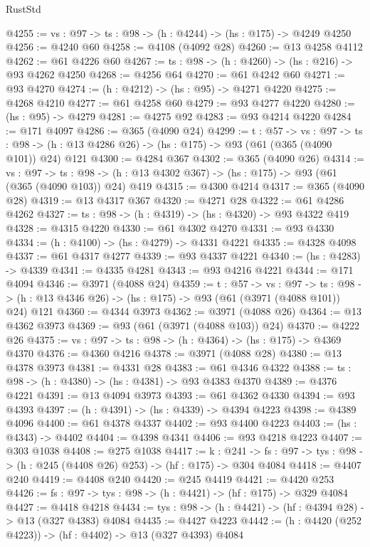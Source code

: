\begin{lexlean}{RustStd}
\begin{coremodule}
@4255 := {vs : @97} -> {ts : @98} -> (h : @4244) -> (hs : @175) -> @4249 @4250
@4256 := @4240 @60
@4258 := @4108 (@4092 @28)
@4260 := @13 @4258 @4112
@4262 := @61 @4226 @60
@4267 := {ts : @98} -> (h : @4260) -> (hs : @216) -> @93 @4262 @4250
@4268 := @4256 @64
@4270 := @61 @4242 @60
@4271 := @93 @4270
@4274 := (h : @4212) -> (hs : @95) -> @4271 @4220
@4275 := @4268 @4210
@4277 := @61 @4258 @60
@4279 := @93 @4277 @4220
@4280 := (hs : @95) -> @4279
@4281 := @4275 @92
@4283 := @93 @4214 @4220
@4284 := @171 @4097
@4286 := @365 (@4090 @24)
@4299 := {t : @57} ->
  {vs : @97} ->
  {ts : @98} -> (h : @13 @4286 @26) -> (hs : @175) -> @93 (@61 (@365 (@4090 @101)) @24) @121
@4300 := @4284 @367
@4302 := @365 (@4090 @26)
@4314 := {vs : @97} ->
  {ts : @98} -> (h : @13 @4302 @367) -> (hs : @175) -> @93 (@61 (@365 (@4090 @103)) @24) @419
@4315 := @4300 @4214
@4317 := @365 (@4090 @28)
@4319 := @13 @4317 @367
@4320 := @4271 @28
@4322 := @61 @4286 @4262
@4327 := {ts : @98} -> (h : @4319) -> (hs : @4320) -> @93 @4322 @419
@4328 := @4315 @4220
@4330 := @61 @4302 @4270
@4331 := @93 @4330
@4334 := (h : @4100) -> (hs : @4279) -> @4331 @4221
@4335 := @4328 @4098
@4337 := @61 @4317 @4277
@4339 := @93 @4337 @4221
@4340 := (hs : @4283) -> @4339
@4341 := @4335 @4281
@4343 := @93 @4216 @4221
@4344 := @171 @4094
@4346 := @3971 (@4088 @24)
@4359 := {t : @57} ->
  {vs : @97} ->
  {ts : @98} -> (h : @13 @4346 @26) -> (hs : @175) -> @93 (@61 (@3971 (@4088 @101)) @24) @121
@4360 := @4344 @3973
@4362 := @3971 (@4088 @26)
@4364 := @13 @4362 @3973
@4369 := @93 (@61 (@3971 (@4088 @103)) @24)
@4370 := @4222 @26
@4375 := {vs : @97} -> {ts : @98} -> (h : @4364) -> (hs : @175) -> @4369 @4370
@4376 := @4360 @4216
@4378 := @3971 (@4088 @28)
@4380 := @13 @4378 @3973
@4381 := @4331 @28
@4383 := @61 @4346 @4322
@4388 := {ts : @98} -> (h : @4380) -> (hs : @4381) -> @93 @4383 @4370
@4389 := @4376 @4221
@4391 := @13 @4094 @3973
@4393 := @61 @4362 @4330
@4394 := @93 @4393
@4397 := (h : @4391) -> (hs : @4339) -> @4394 @4223
@4398 := @4389 @4096
@4400 := @61 @4378 @4337
@4402 := @93 @4400 @4223
@4403 := (hs : @4343) -> @4402
@4404 := @4398 @4341
@4406 := @93 @4218 @4223
@4407 := @303 @1038
@4408 := @275 @1038
@4417 := {k : @241} ->
  {fs : @97} -> {tys : @98} -> (h : @245 (@4408 @26) @253) -> (hf : @175) -> @304 @4084
@4418 := @4407 @240
@4419 := @4408 @240
@4420 := @245 @4419
@4421 := @4420 @253
@4426 := {fs : @97} -> {tys : @98} -> (h : @4421) -> (hf : @175) -> @329 @4084
@4427 := @4418 @4218
@4434 := {tys : @98} -> (h : @4421) -> (hf : @4394 @28) -> @13 (@327 @4383) @4084
@4435 := @4427 @4223
@4442 := (h : @4420 (@252 @4223)) -> (hf : @4402) -> @13 (@327 @4393) @4084

\end{coremodule}
\end{lexlean}
